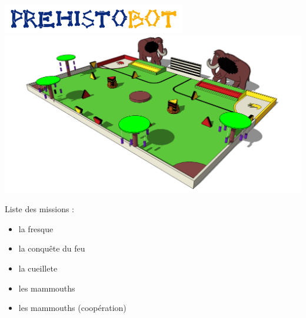 \begin{frame}
   \begin{center}
      \includegraphics[width=0.6\textwidth]{../images/prehistobot.png}\\
      \includegraphics[width=\textwidth]{../images/table.png}
   \end{center}
\end{frame}

\begin{frame}
   Liste des missions :
   \begin{itemize}
      \item la fresque
      \item la conquête du feu
      \item la cueillete
      \item les mammouths
      \item les mammouths (coopération)
   \end{itemize}
\end{frame}
